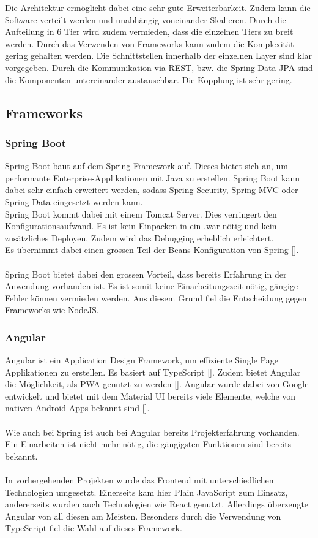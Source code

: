 Die Architektur ermöglicht dabei eine sehr gute Erweiterbarkeit. Zudem kann die Software verteilt werden und unabhängig voneinander Skalieren. Durch die Aufteilung in 6 Tier wird zudem vermieden, dass die einzelnen Tiers zu breit werden. Durch das Verwenden von Frameworks kann zudem die Komplexität gering gehalten werden. Die Schnittstellen innerhalb der einzelnen Layer sind klar vorgegeben. Durch die Kommunikation via REST, bzw. die Spring Data JPA sind die Komponenten untereinander austauschbar. Die Kopplung ist sehr gering. 

\subsection{Frameworks}
\subsubsection{Spring Boot}
Spring Boot baut auf dem Spring Framework auf. Dieses bietet sich an, um performante Enterprise-Applikationen mit Java zu erstellen. Spring Boot kann dabei sehr einfach erweitert werden, sodass Spring Security, Spring MVC oder Spring Data eingesetzt werden kann.\\
Spring Boot kommt dabei mit einem Tomcat Server. Dies verringert den Konfigurationsaufwand. Es ist kein Einpacken in ein .war nötig und kein zusätzliches Deployen. Zudem wird das Debugging erheblich erleichtert.  \\
Es übernimmt dabei einen grossen Teil der Beans-Konfiguration von Spring [\cite{springBoot}].\\\\
Spring Boot bietet dabei den grossen Vorteil, dass bereits Erfahrung in der Anwendung vorhanden ist. Es ist somit keine Einarbeitungszeit nötig, gängige Fehler können vermieden werden. Aus diesem Grund fiel die Entscheidung gegen Frameworks wie NodeJS. 


\subsubsection{Angular}
Angular ist ein Application Design Framework, um effiziente Single Page Applikationen zu erstellen. Es basiert auf TypeScript [\cite{angular}]. Zudem bietet Angular die Möglichkeit, als \ac{PWA} genutzt zu werden [\cite{angularPWA}]. 
Angular wurde dabei von Google entwickelt und bietet mit dem Material UI bereits viele Elemente, welche von nativen Android-Apps bekannt sind [\cite{angularMaterialUI}]. \\\\
Wie auch bei Spring ist auch bei Angular bereits Projekterfahrung vorhanden. Ein Einarbeiten ist nicht mehr nötig, die gängigsten Funktionen sind bereits bekannt. \\\\
In vorhergehenden Projekten wurde das Frontend mit unterschiedlichen Technologien umgesetzt. Einerseits kam hier Plain JavaScript zum Einsatz, andererseits wurden auch Technologien wie \gls{React} genutzt. Allerdings überzeugte Angular von all diesen am Meisten. Besonders durch die Verwendung von TypeScript fiel die Wahl auf dieses Framework. 

